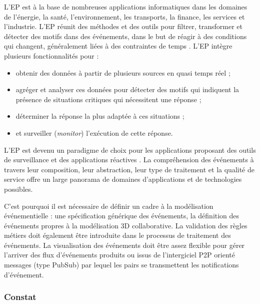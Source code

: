L'\gls{EP} est à la base de nombreuses applications informatiques dans les domaines de l'énergie, la santé, l'environnement, les transports, la finance, les services et l'industrie. L'\gls{EP} réunit des méthodes et des outils 
pour filtrer, transformer et détecter des motifs dans des événements, dans le but 
de réagir à des conditions qui changent, généralement liées à des contraintes de 
temps \cite{Chandy2011}. L'\gls{EP} intègre plusieurs fonctionnalités pour :
\begin{itemize}
	\item obtenir des données à partir de plusieurs sources en quasi temps réel ;
	\item agréger et analyser ces données pour détecter des motifs qui indiquent la 
	présence de situations critiques qui nécessitent une réponse ;
	\item déterminer la réponse la plus adaptée à ces situations ;
	\item et surveiller (\textit{monitor}) l'exécution de cette réponse.
\end{itemize}

L'\gls{EP} est devenu un paradigme de choix pour les applications proposant des 
outils de surveillance et des applications réactives \cite{Hinze2009}. La 
compréhension des événements à travers leur composition, leur abstraction, leur 
type de traitement et la qualité de service offre un large panorama de domaines 
d'applications et de technologies possibles. 

C'est pourquoi il est nécessaire de définir un cadre à la modélisation 
événementielle : une spécification générique des événements, la définition des 
événements propres à la modélisation 3D collaborative. 
La validation des règles métiers doit également être introduite dans 
le processus de traitement des événements. La visualisation des événements doit 
être assez flexible pour gérer l'arriver des flux d'événements produits ou issus 
de l'intergiciel \gls{P2P} orienté messages (type \gls{PubSub}) par lequel les 
pairs se transmettent les notifications d'événement.





\subsubsection{Constat}

